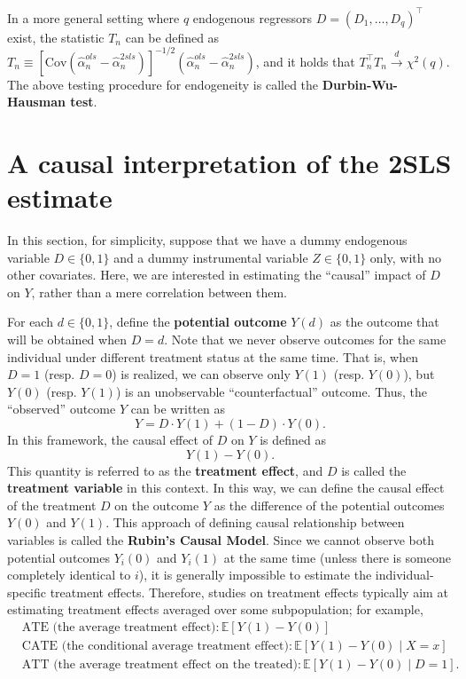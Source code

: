 \documentclass[10.5pt, A4paper, openany, uplatex]{book}
\newcommand{\E}{\mathbb{E}}
\newcommand{\Cov}{\mathrm{Cov}}
\renewcommand{\hat}{\widehat}
\numberwithin{equation}{section}
\begin{document}
In a more general setting where $q$ endogenous regressors $D = (D_1, \ldots, D_q)^\top$ exist, the statistic $T_n$ can be defined as $T_n \equiv \left[\Cov(\hat \alpha_n^{ols} - \hat \alpha_n^{2sls})\right]^{-1/2}(\hat \alpha_n^{ols} - \hat \alpha_n^{2sls})$, and it holds that $T_n^\top T_n \overset{d}{\to} \chi^2(q)$.
The above testing procedure for endogeneity is called the \textbf{Durbin-Wu-Hausman test}.

 
\section{A causal interpretation of the 2SLS estimate}

In this section, for simplicity, suppose that we have a dummy endogenous variable $D \in \{0,1\}$ and a dummy instrumental variable $Z \in \{0,1\}$ only, with no other covariates.
Here, we are interested in estimating the ``causal'' impact of $D$ on $Y$, rather than a mere correlation between them.

For each $d \in \{0,1\}$, define the \textbf{potential outcome} $Y(d)$ as the outcome that will be obtained when $D = d$.
Note that we never observe outcomes for the same individual under different treatment status at the same time.
That is, when $D = 1$ (resp. $D = 0$) is realized, we can observe only $Y(1)$ (resp. $Y(0)$), but $Y(0)$ (resp. $Y(1)$) is an unobservable ``counterfactual'' outcome.
Thus, the ``observed'' outcome $Y$ can be written as
\[
	Y = D \cdot Y(1) + (1 - D) \cdot Y(0).
\]
In this framework, the causal effect of $D$ on $Y$ is defined as
\[
	Y(1) - Y(0).
\]
This quantity is referred to as the \textbf{treatment effect}, and $D$ is called the \textbf{treatment variable} in this context.
In this way, we can define the causal effect of the treatment $D$ on the outcome $Y$ as the difference of the potential outcomes $Y(0)$ and $Y(1)$.
This approach of defining causal relationship between variables is called the \textbf{Rubin's Causal Model}.
Since we cannot observe both potential outcomes $Y_i(0)$ and $Y_i(1)$ at the same time (unless there is someone completely identical to $i$), it is generally impossible to estimate the individual-specific treatment effects.
Therefore, studies on treatment effects typically aim at estimating treatment effects averaged over some subpopulation; for example, 
\begin{align*}
	&\text{ATE (the average treatment effect)}: \E[Y(1) - Y(0)]\\
	&\text{CATE (the conditional average treatment effect)}: \E[Y(1) - Y(0) \mid X = x] \\
	&\text{ATT (the average treatment effect on the treated)}: \E[Y(1) - Y(0) \mid D = 1].
\end{align*}
\end{document}
